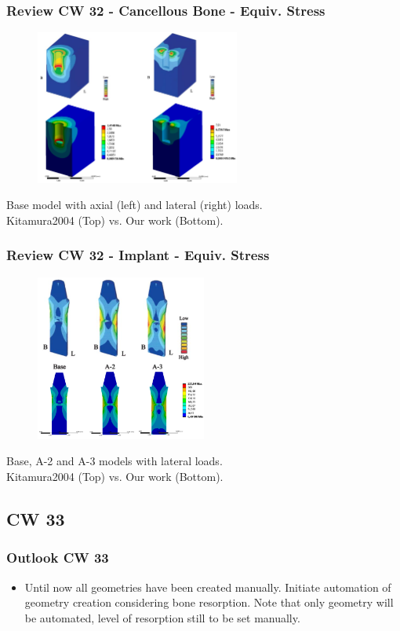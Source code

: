 \begin{frame}
  \frametitle{Review CW 32 - Cancellous Bone - Equiv. Stress}
	\begin{figure}
		\includegraphics[width=0.6\textwidth]{pictures/CW32_5}
	\end{figure}
	\centering Base model with axial (left) and lateral (right) loads. \\
	\centering Kitamura2004 (Top) vs. Our work (Bottom).
\end{frame}

\begin{frame}
  \frametitle{Review CW 32 - Implant - Equiv. Stress}
	\begin{figure}
		\includegraphics[width=0.5\textwidth]{pictures/CW32_6}
	\end{figure}
	\centering Base, A-2 and A-3 models with lateral loads. \\
	\centering Kitamura2004 (Top) vs. Our work (Bottom).
\end{frame}

\subsection{CW 33}
\begin{frame}
  \frametitle{Outlook CW 33}
	\begin{itemize}
		\item Until now all geometries have been created manually. Initiate automation of geometry creation considering bone resorption. Note that only geometry will be automated, level of resorption still to be set manually.
	\end{itemize}
\end{frame}

